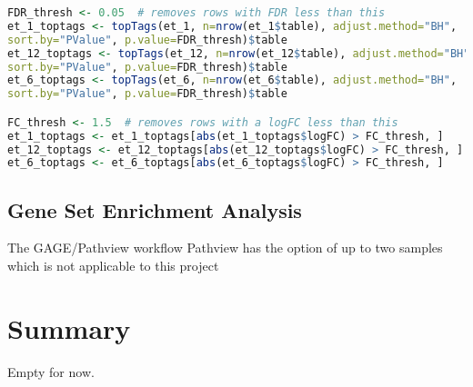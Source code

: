 

\begin{lstlisting}[language=R, caption=Adjusting p-values and filtering data based on the logFC and FDR]
FDR_thresh <- 0.05  # removes rows with FDR less than this
et_1_toptags <- topTags(et_1, n=nrow(et_1$table), adjust.method="BH", 
sort.by="PValue", p.value=FDR_thresh)$table
et_12_toptags <- topTags(et_12, n=nrow(et_12$table), adjust.method="BH", 
sort.by="PValue", p.value=FDR_thresh)$table
et_6_toptags <- topTags(et_6, n=nrow(et_6$table), adjust.method="BH", 
sort.by="PValue", p.value=FDR_thresh)$table

FC_thresh <- 1.5  # removes rows with a logFC less than this
et_1_toptags <- et_1_toptags[abs(et_1_toptags$logFC) > FC_thresh, ]
et_12_toptags <- et_12_toptags[abs(et_12_toptags$logFC) > FC_thresh, ]
et_6_toptags <- et_6_toptags[abs(et_6_toptags$logFC) > FC_thresh, ]
\end{lstlisting}

\subsection{Gene Set Enrichment Analysis}
The GAGE/Pathview workflow
Pathview has the option of up to two samples which is not applicable to this project





\section{Summary}
Empty for now.
